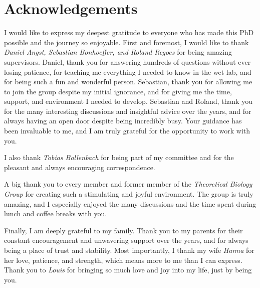 \chapter*{Acknowledgements}
I would like to express my deepest gratitude to everyone who has made this PhD possible and the journey so enjoyable.
First and foremost, I would like to thank \textit{Daniel Angst, Sebastian Bonhoeffer, and Roland Regoes} for being amazing supervisors.
Daniel, thank you for answering hundreds of questions without ever losing patience, for teaching me everything I needed to know in the wet lab, and for being such a fun and wonderful person.
Sebastian, thank you for allowing me to join the group despite my initial ignorance, and for giving me the time, support, and environment I needed to develop.
Sebastian and Roland, thank you for the many interesting discussions and insightful advice over the years, and for always having an open door despite being incredibly busy.
Your guidance has been invaluable to me, and I am truly grateful for the opportunity to work with you.

I also thank \textit{Tobias Bollenbach} for being part of my committee and for the pleasant and always encouraging correspondence.

A big thank you to every member and former member of the \textit{Theoretical Biology Group} for creating such a stimulating and joyful environment.
The group is truly amazing, and I especially enjoyed the many discussions and the time spent during lunch and coffee breaks with you.

Finally, I am deeply grateful to my family.
Thank you to my parents for their constant encouragement and unwavering support over the years, and for always being a place of trust and stability.
Most importantly, I thank my wife \textit{Hanna} for her love, patience, and strength, which means more to me than I can express.
Thank you to \textit{Louis} for bringing so much love and joy into my life, just by being you.
